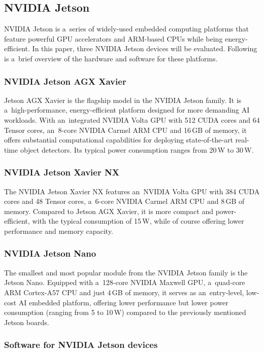 \subsection{NVIDIA Jetson}
\label{Jetsons}

NVIDIA Jetson is a~series of widely-used embedded computing platforms that
feature powerful GPU accelerators and ARM-based CPUs while being
energy-efficient. In this paper, three NVIDIA Jetson devices will be evaluated.
Following is a~brief overview of the hardware and software for these platforms.


\subsubsection{NVIDIA Jetson AGX Xavier}

Jetson AGX Xavier is the flagship model in the NVIDIA Jetson family. It is
a~high-performance, energy-efficient platform designed for more demanding AI
workloads. With an~integrated NVIDIA Volta GPU with 512 CUDA cores and 64 Tensor
cores, an~8-core NVIDIA Carmel ARM CPU and 16\,GB of memory, it offers substantial
computational capabilities for deploying state-of-the-art real-time object
detectors. Its typical power consumption ranges from 20\,W to 30\,W.


\subsubsection{NVIDIA Jetson Xavier NX}

The NVIDIA Jetson Xavier NX features an~NVIDIA Volta GPU with 384 CUDA cores and
48 Tensor cores, a~6-core NVIDIA Carmel ARM CPU and 8\,GB of memory. Compared
to Jetson AGX Xavier, it is more compact and power-efficient, with the typical
consumption of 15\,W, while of course offering lower performance and memory
capacity.


\subsubsection{NVIDIA Jetson Nano}

The smallest and most popular module from the NVIDIA Jetson family is the Jetson
Nano. Equipped with a~128-core NVIDIA Maxwell GPU, a~quad-core ARM Cortex-A57
CPU and just 4\,GB of memory, it serves as an~entry-level, low-cost AI embedded
platform, offering lower performance but lower power consumption (ranging from 5
to 10\,W) compared to the previously mentioned Jetson boards.


\subsubsection{Software for NVIDIA Jetson devices}


